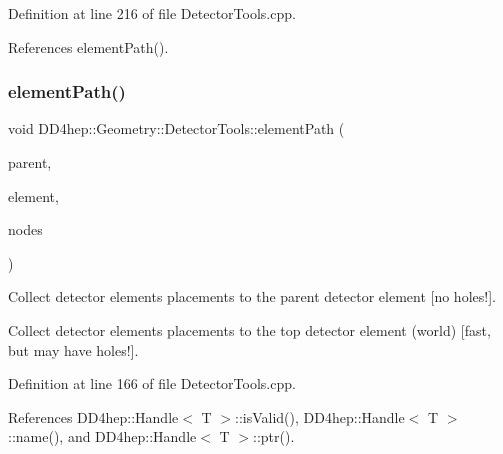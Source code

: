 Definition at line 216 of file Detector\+Tools.\+cpp.



References element\+Path().

\hypertarget{namespace_d_d4hep_1_1_geometry_1_1_detector_tools_a1855be34405c9ce43c236cfba6914850}{}\label{namespace_d_d4hep_1_1_geometry_1_1_detector_tools_a1855be34405c9ce43c236cfba6914850} 
\subsubsection{\texorpdfstring{element\+Path()}{elementPath()}\hspace{0.1cm}{\footnotesize\ttfamily [5/7]}}
{\footnotesize\ttfamily void D\+D4hep\+::\+Geometry\+::\+Detector\+Tools\+::element\+Path (\begin{DoxyParamCaption}\item[{\hyperlink{class_d_d4hep_1_1_geometry_1_1_det_element}{Det\+Element}}]{parent,  }\item[{\hyperlink{class_d_d4hep_1_1_geometry_1_1_det_element}{Det\+Element}}]{element,  }\item[{\hyperlink{namespace_d_d4hep_1_1_geometry_1_1_detector_tools_a6cc33285199e04dd336a33e6e62925e6}{Placement\+Path} \&}]{nodes }\end{DoxyParamCaption})}



Collect detector elements placements to the parent detector element \mbox{[}no holes!\mbox{]}. 

Collect detector elements placements to the top detector element (world) \mbox{[}fast, but may have holes!\mbox{]}. 

Definition at line 166 of file Detector\+Tools.\+cpp.



References D\+D4hep\+::\+Handle$<$ T $>$\+::is\+Valid(), D\+D4hep\+::\+Handle$<$ T $>$\+::name(), and D\+D4hep\+::\+Handle$<$ T $>$\+::ptr().

\hypertarget{namespace_d_d4hep_1_1_geometry_1_1_detector_tools_a67f5a1f1c0ed6ca5698a3323fc660379}{}\label{namespace_d_d4hep_1_1_geometry_1_1_detector_tools_a67f5a1f1c0ed6ca5698a3323fc660379} 
